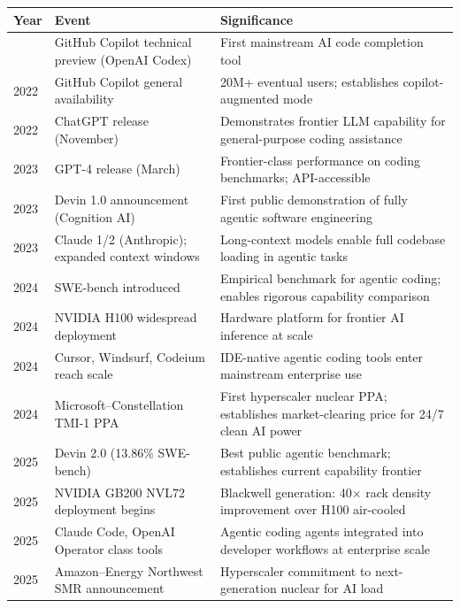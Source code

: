 \documentclass{article}
\begin{document}
\begin{longtable}{@{}p{1.2cm}p{5.5cm}p{5.5cm}@{}}
\toprule
\textbf{Year} & \textbf{Event} & \textbf{Significance} \\
\midrule
\endhead
\bottomrule
\endfoot
2021 & GitHub Copilot technical preview (OpenAI Codex) & First mainstream AI code completion tool \\
2022 & GitHub Copilot general availability & 20M+ eventual users; establishes copilot-augmented mode \\
2022 & ChatGPT release (November) & Demonstrates frontier LLM capability for general-purpose coding assistance \\
2023 & GPT-4 release (March) & Frontier-class performance on coding benchmarks; API-accessible \\
2023 & Devin 1.0 announcement (Cognition AI) & First public demonstration of fully agentic software engineering \\
2023 & Claude 1/2 (Anthropic); expanded context windows & Long-context models enable full codebase loading in agentic tasks \\
2024 & SWE-bench introduced & Empirical benchmark for agentic coding; enables rigorous capability comparison \\
2024 & NVIDIA H100 widespread deployment & Hardware platform for frontier AI inference at scale \\
2024 & Cursor, Windsurf, Codeium reach scale & IDE-native agentic coding tools enter mainstream enterprise use \\
2024 & Microsoft--Constellation TMI-1 PPA & First hyperscaler nuclear PPA; establishes market-clearing price for 24/7 clean AI power \\
2025 & Devin 2.0 (13.86\% SWE-bench) & Best public agentic benchmark; establishes current capability frontier \\
2025 & NVIDIA GB200 NVL72 deployment begins & Blackwell generation: 40$\times$ rack density improvement over H100 air-cooled \\
2025 & Claude Code, OpenAI Operator class tools & Agentic coding agents integrated into developer workflows at enterprise scale \\
2025 & Amazon--Energy Northwest SMR announcement & Hyperscaler commitment to next-generation nuclear for AI load \\
\end{longtable}
\end{document}
